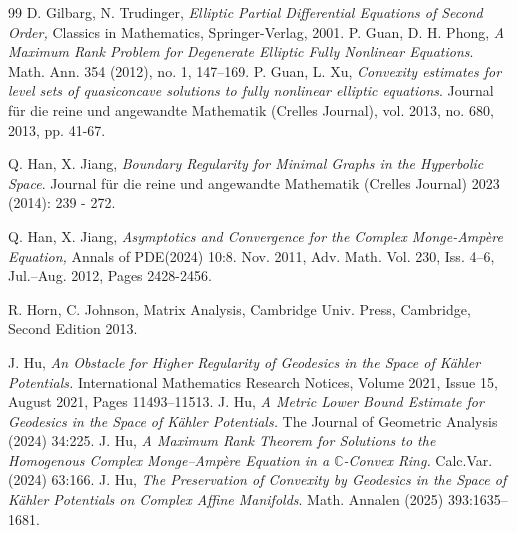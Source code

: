 \documentclass{article}
\numberwithin{equation}{section}
\newcommand{\EC}{\mathbb{C}}
\begin{document}
\begin{thebibliography}{99}
 D. Gilbarg, N. Trudinger, {\em Elliptic Partial Differential Equations of Second Order,} Classics in Mathematics, Springer-Verlag, 2001. 
	 P. Guan, D. H. Phong, {\em A Maximum Rank Problem for Degenerate Elliptic Fully Nonlinear Equations}. Math. Ann. {354} (2012), no. 1, 147--169.
	P. Guan, L. Xu, {\em Convexity estimates for level sets of quasiconcave solutions to fully nonlinear elliptic equations}. Journal für die reine und angewandte Mathematik (Crelles Journal), vol. 2013, no. 680, 2013, pp. 41-67.
	
	  Q. Han, X. Jiang, {\em Boundary Regularity for Minimal Graphs in the Hyperbolic Space}. Journal für die reine und angewandte Mathematik (Crelles Journal) 2023 (2014): 239 - 272.

 Q. Han, X. Jiang, {\em Asymptotics and Convergence for the Complex Monge-Amp\`ere Equation,} Annals of PDE(2024) 10:8.
Nov. 2011, Adv. Math. Vol. 230, Iss. 4–6, Jul.–Aug. 2012, Pages 2428-2456.

 R. Horn, C. Johnson, Matrix Analysis, Cambridge Univ. Press, Cambridge, Second Edition 2013.

	 J. Hu, {\em An Obstacle for Higher Regularity of Geodesics in the Space of K\"ahler Potentials.} International Mathematics Research Notices, Volume 2021, Issue 15, August 2021, Pages 11493–11513.
	 J. Hu, {\em A Metric Lower Bound Estimate for  Geodesics in the Space of K\"ahler Potentials.} The Journal of Geometric Analysis (2024) 34:225.
	J. Hu, {\em A Maximum Rank Theorem for Solutions to the Homogenous Complex Monge–Amp\`ere Equation in a $\EC$-Convex Ring.} Calc.Var.(2024) 63:166.
	J. Hu, {\em The Preservation of Convexity by Geodesics in the Space of K\"ahler Potentials on Complex Affine Manifolds}. 	Math. Annalen (2025) 393:1635–1681.



\end{thebibliography}
\end{document}
